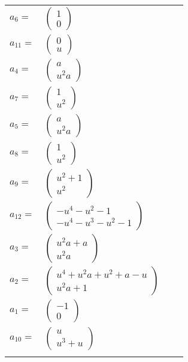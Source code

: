 \documentclass[1p]{elsarticle_modified}
\theoremstyle{definition}
\begin{document}
\begin{tabular}{m{7pt} m{180pt} m{7pt} m{180pt} }
\flushright $a_{6}=$&$\begin{pmatrix}1\\0\end{pmatrix}$ \\
\flushright $a_{11}=$&$\begin{pmatrix}0\\u\end{pmatrix}$ \\
\flushright $a_{4}=$&$\begin{pmatrix}a\\u^2 a\end{pmatrix}$ \\
\flushright $a_{7}=$&$\begin{pmatrix}1\\u^2\end{pmatrix}$ \\
\flushright $a_{5}=$&$\begin{pmatrix}a\\u^2 a\end{pmatrix}$ \\
\flushright $a_{8}=$&$\begin{pmatrix}1\\u^2\end{pmatrix}$ \\
\flushright $a_{9}=$&$\begin{pmatrix}u^2+1\\u^2\end{pmatrix}$ \\
\flushright $a_{12}=$&$\begin{pmatrix}- u^4- u^2-1\\- u^4- u^3- u^2-1\end{pmatrix}$ \\
\flushright $a_{3}=$&$\begin{pmatrix}u^2 a+a\\u^2 a\end{pmatrix}$ \\
\flushright $a_{2}=$&$\begin{pmatrix}u^4+u^2 a+u^2+a- u\\u^2 a+1\end{pmatrix}$ \\
\flushright $a_{1}=$&$\begin{pmatrix}-1\\0\end{pmatrix}$ \\
\flushright $a_{10}=$&$\begin{pmatrix}u\\u^3+u\end{pmatrix}$\\&\end{tabular}
\end{document}

